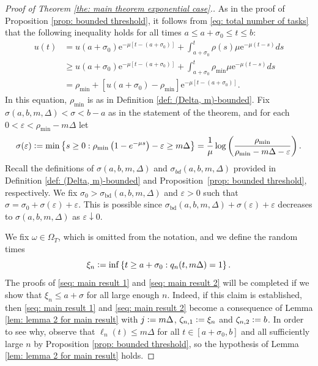 \documentclass[a4paper, 12pt]{article}
\theoremstyle{definition}
\newcommand{\set}[2]{\left\{#1 : #2\right\}}
\newcommand{\defeq}{\vcentcolon=}
\newcommand{\bd}{\mathrm{bd}}
\newcommand{\e}{\mathrm{e}}
\begin{document}
\begin{proof}[Proof of Theorem \ref{the: main theorem exponential case}.]
As in the proof of Proposition \ref{prop: bounded threshold}, it follows from \eqref{eq: total number of tasks} that the following inequality holds for all times $a \leq a + \sigma_0 \leq t \leq b$:
\begin{equation}
	\label{eq: lower bound for u}
	\begin{split}
		u(t) &= u(a + \sigma_0)\e^{-\mu[t - (a + \sigma_0)]} + \int_{a + \sigma_0}^t \rho(s) \mu \e^{-\mu(t - s)}ds \\
		&\geq u(a + \sigma_0)\e^{-\mu[t - (a + \sigma_0)]} + \int_{a + \sigma_0}^t \rho_{\min} \mu \e^{-\mu(t - s)}ds \\
		&= \rho_{\min} + \left[u(a + \sigma_0) - \rho_{\min}\right]\e^{-\mu[t - (a + \sigma_0)]}.
	\end{split}
\end{equation}
In this equation, $\rho_{\min}$ is as in Definition \ref{def: (Delta, m)-bounded}. Fix $\sigma(a, b, m, \Delta) < \sigma < b - a$ as in the statement of the theorem, and for each $0 < \varepsilon < \rho_{\min} - m\Delta$ let
\begin{equation*}
	\sigma(\varepsilon) \defeq \min \set{s \geq 0}{\rho_{\min}\left(1 - e^{-\mu s}\right) - \varepsilon \geq m\Delta} = \frac{1}{\mu}\log \left(\frac{\rho_{\min}}{\rho_{\min} - m\Delta - \varepsilon}\right).
\end{equation*}
Recall the definitions of $\sigma(a, b, m, \Delta)$ and $\sigma_{bd}(a, b, m, \Delta)$ provided in Definition \ref{def: (Delta, m)-bounded} and Proposition~\ref{prop: bounded threshold}, respectively. We fix $\sigma_0 > \sigma_{\bd}(a, b, m, \Delta)$ and $\varepsilon > 0$ such that $\sigma = \sigma_0 + \sigma(\varepsilon) + \varepsilon$. This is possible since $\sigma_{\bd}(a, b, m, \Delta) + \sigma(\varepsilon) + \varepsilon$ decreases to $\sigma(a, b, m, \Delta)$ as $\varepsilon\downarrow0$.

We fix $\omega \in \Omega_T$, which is omitted from the notation, and we define the random times
\begin{equation*}
	\xi_n \defeq \inf \set{t \geq a + \sigma_0}{q_n(t, m \Delta) = 1}.
\end{equation*}
The proofs of \eqref{seq: main result 1} and \eqref{seq: main result 2} will be completed if we show that $\xi_n \leq a + \sigma$ for all large enough $n$. Indeed, if this claim is established, then \eqref{seq: main result 1} and \eqref{seq: main result 2} become a consequence of Lemma \ref{lem: lemma 2 for main result} with $j \defeq m\Delta$, $\zeta_{n, 1} \defeq \xi_n$ and $\zeta_{n, 2} \defeq b$. In order to see why, observe that $\ell_n(t) \leq m \Delta$ for all $t \in [a + \sigma_0, b]$ and all sufficiently large $n$ by Proposition \ref{prop: bounded threshold}, so the hypothesis of Lemma \ref{lem: lemma 2 for main result} holds.


\end{proof}
\end{document}
